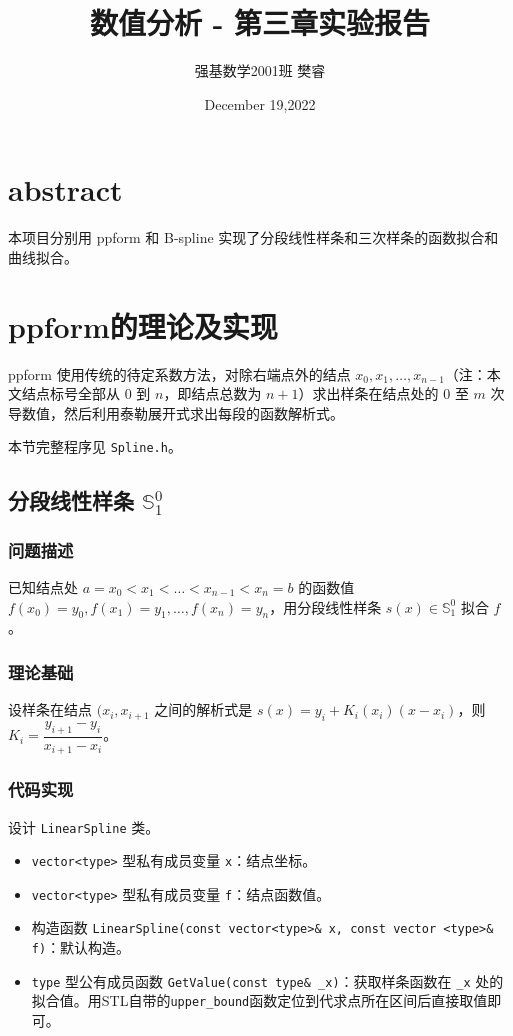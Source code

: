 \documentclass{ctexart}
\title{数值分析 - 第三章实验报告}
\author{强基数学2001班 樊睿}
\date{December 19,2022}
\begin{document}
\maketitle

\section{abstract}

本项目分别用 ppform 和 B-spline 实现了分段线性样条和三次样条的函数拟合和曲线拟合。

\section{ppform的理论及实现}

ppform 使用传统的待定系数方法，对除右端点外的结点 $x_0,x_1,\dots,x_{n-1}$（注：本文结点标号全部从 $0$ 到 $n$，即结点总数为 $n+1$）求出样条在结点处的 $0$ 至 $m$ 次导数值，然后利用泰勒展开式求出每段的函数解析式。

本节完整程序见 \verb|Spline.h|。

\subsection{分段线性样条 $\mathbb{S}_1^0$}

\subsubsection{问题描述}

已知结点处 $a=x_0<x_1<\dots<x_{n-1}<x_n=b$ 的函数值 $f(x_0)=y_0,f(x_1)=y_1,\dots,f(x_n)=y_n$，用分段线性样条 $s(x)\in \mathbb{S}_1^0$ 拟合 $f$。

\subsubsection{理论基础}

设样条在结点 $(x_i,x_{i+1}$ 之间的解析式是 $s(x)=y_i+K_i(x_i)(x-x_i)$，则 $K_i=\dfrac{y_{i+1}-y_i}{x_{i+1}-x_i}$。

\subsubsection{代码实现}

设计 \verb|LinearSpline| 类。
\begin{itemize}
\item \verb|vector<type>| 型私有成员变量 \verb|x|：结点坐标。
\item \verb|vector<type>| 型私有成员变量 \verb|f|：结点函数值。
\item 构造函数 \verb|LinearSpline(const vector<type>& x, const vector <type>& f)|：默认构造。
\item \verb|type| 型公有成员函数 \verb|GetValue(const type& _x)|：获取样条函数在 \verb|_x| 处的拟合值。用STL自带的\verb|upper_bound|函数定位到代求点所在区间后直接取值即可。
\end{itemize}
\end{document}
